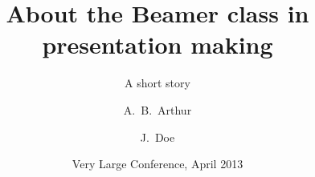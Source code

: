 

\title[About Beamer] %
{About the Beamer class in presentation making}
 
\subtitle{A short story}
 
\author[Arthur, Doe] %
{A.~B.~Arthur \and J.~Doe}
 
 
\date[VLC 2013] %
{Very Large Conference, April 2013}
 

